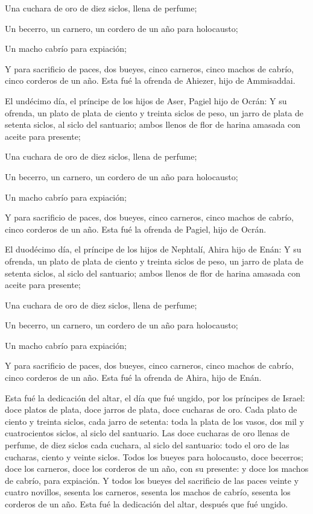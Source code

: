  Una cuchara de oro de diez siclos, llena de perfume;

 Un becerro, un carnero, un cordero de un año para
holocausto;

 Un macho cabrío para expiación;

 Y para sacrificio de paces, dos bueyes, cinco carneros,
cinco machos de cabrío, cinco corderos de un año. Esta fué la ofrenda de
Ahiezer, hijo de Ammisaddai.

 El undécimo día, el príncipe de los hijos de Aser,
Pagiel hijo de Ocrán:  Y su ofrenda, un plato de plata de
ciento y treinta siclos de peso, un jarro de plata de setenta siclos, al
siclo del santuario; ambos llenos de flor de harina amasada con aceite
para presente;

 Una cuchara de oro de diez siclos, llena de perfume;

 Un becerro, un carnero, un cordero de un año para
holocausto;

 Un macho cabrío para expiación;

 Y para sacrificio de paces, dos bueyes, cinco carneros,
cinco machos de cabrío, cinco corderos de un año. Esta fué la ofrenda de
Pagiel, hijo de Ocrán.

 El duodécimo día, el príncipe de los hijos de Nephtalí,
Ahira hijo de Enán:  Y su ofrenda, un plato de plata de
ciento y treinta siclos de peso, un jarro de plata de setenta siclos, al
siclo del santuario; ambos llenos de flor de harina amasada con aceite
para presente;

 Una cuchara de oro de diez siclos, llena de perfume;

 Un becerro, un carnero, un cordero de un año para
holocausto;

 Un macho cabrío para expiación;

 Y para sacrificio de paces, dos bueyes, cinco carneros,
cinco machos de cabrío, cinco corderos de un año. Esta fué la ofrenda de
Ahira, hijo de Enán.

 Esta fué la dedicación del altar, el día que fué ungido,
por los príncipes de Israel: doce platos de plata, doce jarros de plata,
doce cucharas de oro.  Cada plato de ciento y treinta
siclos, cada jarro de setenta: toda la plata de los vasos, dos mil y
cuatrocientos siclos, al siclo del santuario.  Las doce
cucharas de oro llenas de perfume, de diez siclos cada cuchara, al siclo
del santuario: todo el oro de las cucharas, ciento y veinte siclos.
 Todos los bueyes para holocausto, doce becerros; doce
los carneros, doce los corderos de un año, con su presente: y doce los
machos de cabrío, para expiación.  Y todos los bueyes del
sacrificio de las paces veinte y cuatro novillos, sesenta los carneros,
sesenta los machos de cabrío, sesenta los corderos de un año. Esta fué
la dedicación del altar, después que fué ungido.

